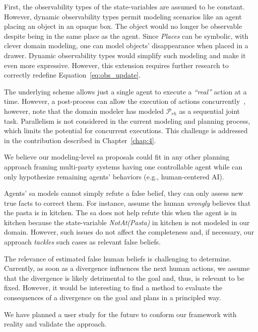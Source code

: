 First, the observability types of the state-variables are assumed to be constant. 
However, dynamic observability types permit modeling scenarios like an agent placing an object in an opaque box. The object would no longer be observable despite being in the same place as the agent. Since \textit{Places} can be symbolic, with clever domain modeling, one can model objects' disappearance when placed in a drawer. Dynamic observability types would simplify such modeling and make it even more expressive. However, this extension requires further research to correctly redefine Equation~\ref{eq:obs_update}. 

The underlying scheme allows just a single agent to execute a \textit{``real''} action at a time. 
However, a post-process can allow the execution of actions concurrently~\cite{CrosbyJR14}, however, note that the domain modeler has modeled $\mathcal{P}_{rh}$ as a sequential joint task. 
Parallelism is not considered in the current modeling and planning process, which limits the potential for concurrent executions. This challenge is addressed in the contribution described in Chapter~\ref{chap:4}.

We believe our modeling-level \acrshort{sa} proposals could fit in any other planning approach framing multi-party systems having one controllable agent while can only hypothesize remaining agents' behaviors (e.g., human-centered AI).

Agents' \acrshort{sa} models cannot simply refute a false belief, they can only assess new true facts to correct them.
For instance, assume the human \textit{wrongly} believes that the pasta is in \textsf{kitchen}. The \acrshort{sa} does not help refute this when the agent is in \textsf{kitchen}
because the state-variable \textit{NotAt(Pasta)} in \textsf{kitchen} is not modeled in our domain.  
However, such issues do not affect the completeness and, if necessary, our approach \textit{tackles} such cases as relevant false beliefs.

The relevance of estimated false human beliefs is challenging to determine. Currently, as soon as a divergence influences the next human actions, we assume that the divergence is likely detrimental to the goal and, thus, is relevant to be fixed. However, it would be interesting to find a method to evaluate the consequences of a divergence on the goal and plans in a principled way.

We have planned a user study for the future to conform our framework with reality and validate the approach.

